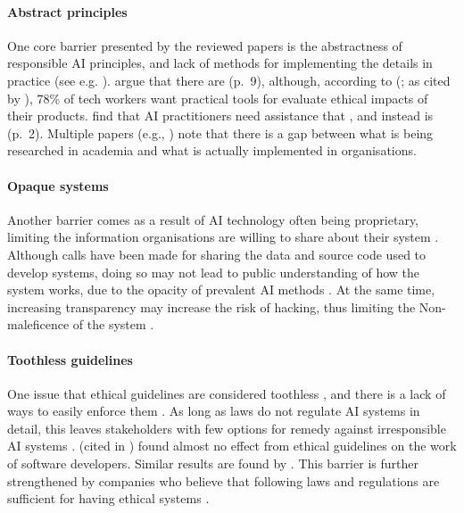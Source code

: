 \paragraph{Abstract principles}
One core barrier presented by the reviewed papers is the abstractness of responsible AI principles, and lack of methods for implementing the details in practice (see e.g. \cite{Jakesch_2022,Havrda_2020,BarredoArrieta_2020,Lukkien_2021}). \textcite{Gianni_2022} argue that there are  (p.~9), although, according to \citeauthor{Miller_2019_techworker} (\citeyear{Miller_2019_techworker}; as cited by \cite{Morley_2020}), 78\% of tech workers want practical tools for evaluate ethical impacts of their products. \textcite{Morley_2021} find that AI practitioners need assistance that , and instead is  (p.~2). Multiple papers (e.g., \cite{Chen_2020,BarredoArrieta_2020,Rakova_2021}) note that there is a gap between what is being researched in academia and what is actually implemented in organisations.


\paragraph{Opaque systems}
Another barrier comes as a result of AI technology often being proprietary, limiting the information organisations are willing to share about their system \parencite{Buhmann_2021,Hacker_2022}. Although calls have been made for sharing the data and source code used to develop systems, doing so may not lead to public understanding of how the system works, due to the opacity of prevalent AI methods \parencite{Buhmann_2021,Siala_2022}. At the same time, increasing transparency may increase the risk of hacking, thus limiting the Non-maleficence of the system \parencite{Cheng_2021}.

\paragraph{Toothless guidelines}
One issue that ethical guidelines are considered toothless \parencite{Henriksen_2021}, and there is a lack of ways to easily enforce them \parencite{Liu_2021,Hagendorff_2020}. As long as laws do not regulate AI systems in detail, this leaves stakeholders with few options for remedy against irresponsible AI systems \parencite{Henriksen_2021}. \textcite{McNamara_2018_results} (cited in \cite{Nevanperä_2021}) found almost no effect from ethical guidelines on the work of software developers. Similar results are found by \textcite{Hagendorff_2020}. This barrier is further strengthened by companies who believe that following laws and regulations are sufficient for having ethical systems \parencite{Vakkuri_2022}. 


